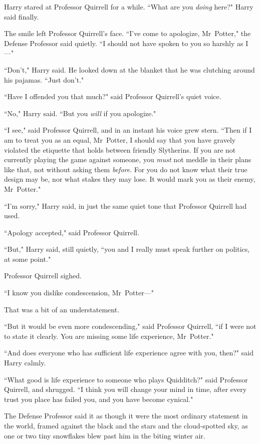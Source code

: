 Harry stared at Professor Quirrell for a while. ``What are you \emph{doing} here?" Harry said finally.

The smile left Professor Quirrell's face. ``I've come to apologize, Mr~Potter," the Defense Professor said quietly. ``I should not have spoken to you so harshly as I—"

``Don't," Harry said. He looked down at the blanket that he was clutching around his pajamas. ``Just don't."

``Have I offended you that much?" said Professor Quirrell's quiet voice.

``No," Harry said. ``But you \emph{will} if you apologize."

``I see," said Professor Quirrell, and in an instant his voice grew stern. ``Then if I am to treat you as an equal, Mr~Potter, I should say that you have gravely violated the etiquette that holds between friendly Slytherins. If you are not currently playing the game against someone, you \emph{must} not meddle in their plans like that, not without asking them \emph{before}. For you do not know what their true design may be, nor what stakes they may lose. It would mark you as their enemy, Mr~Potter."

``I'm sorry," Harry said, in just the same quiet tone that Professor Quirrell had used.

``Apology accepted," said Professor Quirrell.

``But," Harry said, still quietly, ``you and I really must speak further on politics, at some point."

Professor Quirrell sighed.

``I know you dislike condescension, Mr~Potter—"

That was a bit of an understatement.

``But it would be even more condescending," said Professor Quirrell, ``if I were not to state it clearly. You are missing some life experience, Mr~Potter."

``And does everyone who has sufficient life experience agree with you, then?" said Harry calmly.

``What good is life experience to someone who plays Quidditch?" said Professor Quirrell, and shrugged. ``I think you will change your mind in time, after every trust you place has failed you, and you have become cynical."

The Defense Professor said it as though it were the most ordinary statement in the world, framed against the black and the stars and the cloud-spotted sky, as one or two tiny snowflakes blew past him in the biting winter air.

